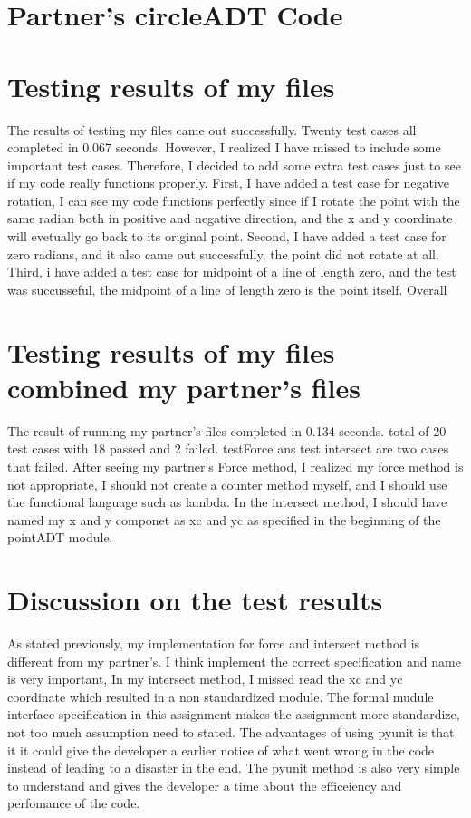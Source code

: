 \documentclass[12pt]{article}
\begin{document}
\lstset{language=make}
\noindent 

\newpage

\section{Partner's circleADT Code} \label{PartnerCodeSect}

\lstset{language=Python}

\noindent 

\section*{Testing results of my files}

The results of testing my files came out successfully. Twenty test cases all completed in
0.067 seconds. However, I realized I have missed to include some important test cases.
Therefore, I decided to add some extra test cases just to see if my code really functions 
properly. First, I have added a test case for negative rotation, I can see my code functions
perfectly since if I rotate the point with the same radian both in positive and negative direction,
and the x and y coordinate will evetually go back to its original point. Second, I have added a 
test case for zero radians, and it also came out successfully, the point did not rotate at all. Third, 
i have added a test case for midpoint of a line of length zero, and the test was succusseful,
the midpoint of a line of length zero is the point itself. Overall 

\section*{Testing results of my files combined my partner's files}
The result of running my partner's files completed in 0.134 seconds. total of 20 test cases with 18 passed 
and 2 failed. testForce ans test intersect are two cases that failed. After seeing my partner's Force method,
I realized my force method is not appropriate, I should not create a counter method myself, and I should use
the functional language such as lambda. In the intersect method, I should have named my x and y componet 
as xc and yc as specified in the beginning of the pointADT module.

\section*{Discussion on the test results}
As stated previously,  my implementation for force and intersect method is different from 
my partner's. I think implement the correct specification and name is very important, In my
intersect method, I missed read the xc and yc coordinate which resulted in a non standardized
module. The formal mudule interface specification in this assignment makes the assignment more
standardize, not too much assumption need to stated. The advantages of using pyunit is that it
it could give the developer a earlier notice of what went wrong in the code instead of leading to a disaster
in the end. The pyunit method is also very simple to understand and gives the developer a time about
the efficeiency and perfomance of the code.
\end{document}
